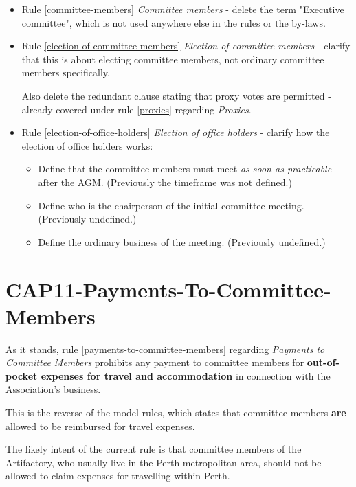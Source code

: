 \documentclass[../constitution.tex]{subfiles}
\begin{document}
\begin{itemize}


\item Rule \ref{committee-members} \textit{Committee members} - delete the term "Executive committee", which is not used anywhere else in the rules or the by-laws.

\item Rule \ref{election-of-committee-members} \textit{Election of committee members} - clarify that this is about electing committee members, not ordinary committee members specifically.

Also delete the redundant clause stating that proxy votes are permitted - already covered under rule \ref{proxies} regarding \textit{Proxies}.

\item Rule \ref{election-of-office-holders} \textit{Election of office holders} - clarify how the election of office holders works:

  \begin{itemize}
  \item Define that the committee members must meet \textit{as soon as practicable} after the AGM. (Previously the timeframe was not defined.)
  \item Define who is the chairperson of the initial committee meeting. (Previously undefined.)
  \item Define the ordinary business of the meeting. (Previously undefined.)
  \end{itemize}

\end{itemize}

\section*{CAP11-Payments-To-Committee-Members}

As it stands, rule \ref{payments-to-committee-members} regarding \textit{Payments to Committee Members} prohibits any payment to committee members for \textbf{out-of-pocket expenses for travel and accommodation} in connection with the Association's business.

This is the reverse of the model rules, which states that committee members \textbf{are} allowed to be reimbursed for travel expenses.

The likely intent of the current rule is that committee members of the Artifactory, who usually live in the Perth metropolitan area, should not be allowed to claim expenses for travelling within Perth.
\end{document}
